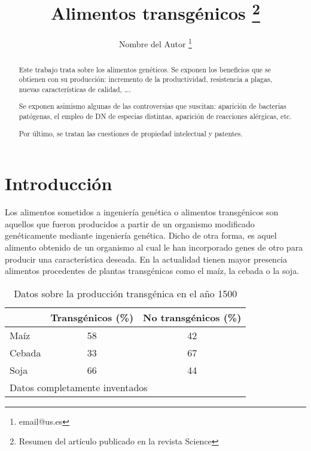 \documentclass[11pt,a4paper]{article}
\title{Alimentos transgénicos
\thanks{Resumen del artículo publicado en la revista Science}}
\author{Nombre del Autor
\thanks{email@us.es}}
\date{}
\begin{document}
\maketitle




\begin{abstract}
Este trabajo trata sobre los alimentos genéticos. Se exponen los beneficios que se obtienen con su producción: incremento de la productividad, resistencia a plagas, nuevas características de calidad, \dots. 

Se exponen asimismo algunas de las controversias que suscitan: aparición de bacterias patógenas, el empleo de DN de especias distintas, aparición de reacciones alérgicas, etc.

Por último, se tratan las cuestiones de propiedad intelectual y patentes.
\end{abstract}





\section{Introducción}

Los alimentos sometidos a ingeniería genética o alimentos transgénicos son aquellos que fueron producidos a partir de un organismo modificado genéticamente mediante ingeniería genética. Dicho de otra forma, es aquel alimento obtenido de un organismo al cual le han incorporado genes de otro para producir una característica deseada. En la actualidad tienen mayor presencia alimentos procedentes de plantas transgénicas como el maíz, la cebada o la soja.


\begin{table}[h!]
\centering
\begin{tabular}{|l|c|c|}
\hline
     &  Transgénicos (\%)  & No transgénicos (\%)  \\
\hline\hline
Maíz  &    58  &   42 \\
\hline
Cebada &   33   &  67   \\
\hline
Soja   &  66   & 44 \\
\hline
\multicolumn{3}{l}{\footnotesize Datos completamente inventados}
\end{tabular}
\caption{Datos sobre la producción transgénica en el año 1500}
\label{tabla.transg}
\end{table}
\end{document}
